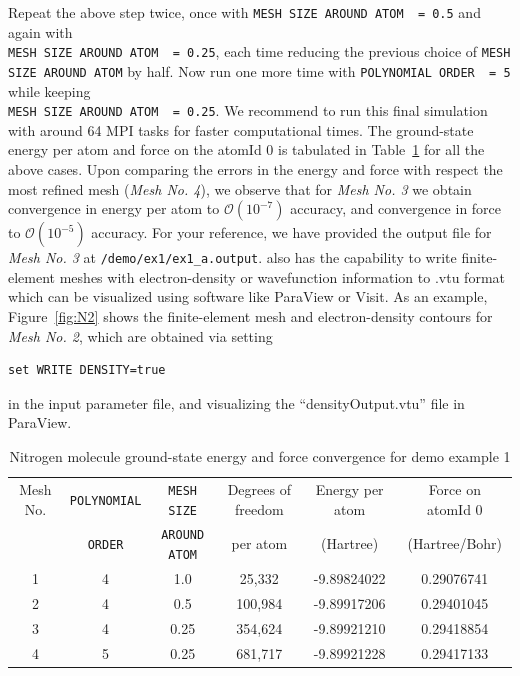 \begin{enumerate}
Repeat the above step twice, once with \verb|MESH SIZE AROUND ATOM  = 0.5| and again with\\ \verb|MESH SIZE AROUND ATOM  = 0.25|, each time reducing the previous choice of \verb|MESH SIZE AROUND ATOM| by half. Now run one more time with \verb|POLYNOMIAL ORDER  = 5| while keeping \\ \verb|MESH SIZE AROUND ATOM  = 0.25|. We recommend to run this final simulation with around 64 MPI tasks for faster computational times. The ground-state energy per atom and force on the atomId 0 is tabulated in Table~\ref{tab:table1} for all the above cases. Upon comparing the errors in the energy and force with respect the most refined mesh (\emph{Mesh No. 4}), we observe that for \emph{Mesh No. 3} we obtain convergence in energy per atom to $\mathcal{O}(10^{-7})$ accuracy, and convergence in force to $\mathcal{O}(10^{-5})$ accuracy. For your reference, we have provided the output file for \emph{Mesh No. 3} at \verb|/demo/ex1/ex1_a.output|. \dftfe{} also has the capability to write finite-element meshes with electron-density or wavefunction information to .vtu format which can be visualized using software like ParaView or Visit. As an example, Figure~\ref{fig:N2} shows the finite-element mesh and electron-density contours for \emph{Mesh No. 2}, which are obtained via setting
\begin{verbatim}
set WRITE DENSITY=true
\end{verbatim}
in the input parameter file, and visualizing the ``densityOutput.vtu'' file in ParaView.
\begin{table}[h!]
  \begin{center}
\small	  
    \caption{Nitrogen molecule ground-state energy and force convergence for demo example 1}
    \label{tab:table1}
    \begin{tabular}{c|c|c|c|c|c}
	    \hline\hline
	    Mesh No. &\verb|POLYNOMIAL| &\verb|MESH SIZE| & Degrees of freedom& Energy per atom & Force on atomId 0\\
	    &\verb|ORDER| &\verb|AROUND ATOM| & per atom  & (Hartree) & (Hartree/Bohr) \\
      \hline\hline
	    1& 4 & 1.0 & 25,332 & -9.89824022 &  0.29076741\\
	    2&4 & 0.5 &  100,984& -9.89917206 &  0.29401045\\
	    3&4 & 0.25 & 354,624 & -9.89921210 &  0.29418854\\
	    4&5 & 0.25 & 681,717 & -9.89921228 &  0.29417133\\
	    \hline\hline
    \end{tabular}
  \end{center}
\end{table}


\end{enumerate}
